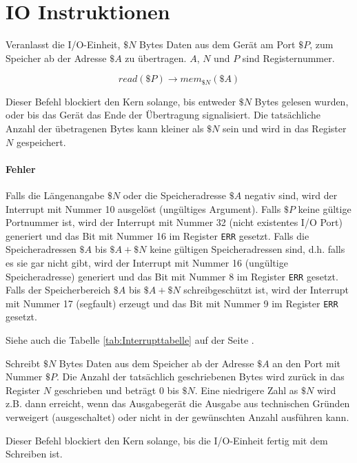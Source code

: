 \section{IO Instruktionen}
\label{sec:IO-Instruktionen}




Veranlasst die I/O-Einheit, $\$N$ Bytes Daten aus dem Gerät am Port $\$P$, zum
Speicher ab der Adresse $\$A$ zu übertragen. $A$, $N$ und $P$ sind
Registernummer.

\[
  read(\$P) \to mem_{\$N}(\$A)
\]

Dieser Befehl blockiert den Kern solange, bis entweder $\$N$ Bytes gelesen
wurden, oder bis das Gerät das Ende der Übertragung signalisiert. Die
tatsächliche Anzahl der übetragenen Bytes kann kleiner als $\$N$ sein und wird
in das Register $N$ gespeichert.


\paragraph{Fehler}
Falls die Längenangabe $\$N$ oder die Speicheradresse $\$A$ negativ sind, wird
der Interrupt mit Nummer 10 ausgelöst (ungültiges Argument).
Falls $\$P$ keine gültige Portnummer ist, wird der Interrupt mit Nummer 32
(nicht existentes I/O Port) generiert und das Bit mit Nummer 16 im Register
\texttt{ERR} gesetzt. Falls die Speicheradressen $\$A$ bis $\$A + \$N$ keine
gültigen Speicheradressen sind, d.h. falls es sie gar nicht gibt, wird der
Interrupt mit Nummer 16 (ungültige Speicheradresse) generiert und das Bit mit
Nummer 8 im Register \texttt{ERR} gesetzt. Falls der Speicherbereich $\$A$ bis
$\$A + \$N$ schreibgeschützt ist, wird der Interrupt mit Nummer 17 (segfault)
erzeugt und das Bit mit Nummer 9 im Register \texttt{ERR} gesetzt.

Siehe auch die Tabelle \ref{tab:Interrupttabelle} auf der Seite
\pageref{tab:Interrupttabelle}.


Schreibt $\$N$ Bytes Daten aus dem Speicher ab der Adresse $\$A$ an den Port mit
Nummer $\$P$. Die Anzahl der tatsächlich geschriebenen Bytes wird zurück in das
Register $N$ geschrieben und beträgt $0$ bis $\$N$. Eine niedrigere Zahl
as $\$N$ wird z.B. dann erreicht, wenn das Ausgabegerät die Ausgabe aus
technischen Gründen verweigert (ausgeschaltet) oder nicht in der gewünschten
Anzahl ausführen kann.

Dieser Befehl blockiert den Kern solange, bis die I/O-Einheit fertig mit dem
Schreiben ist.

